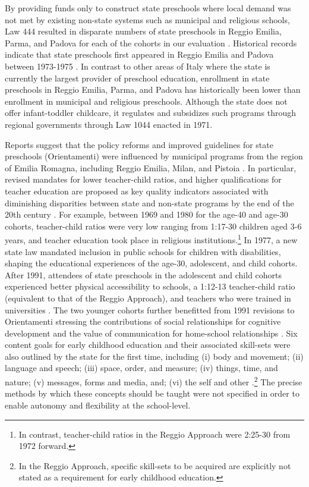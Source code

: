By providing funds only to construct state preschools where local demand was not met by existing non-state systems such as municipal and religious schools, Law 444 resulted in disparate numbers of state preschools in Reggio Emilia, Parma, and Padova for each of the cohorts in our evaluation \citep{Hohnerlein_2009_Paradox-Public-Preschools}. Historical records indicate that state preschools first appeared in Reggio Emilia and Padova between 1973-1975 \citep{Padova-Admin-Data_1964-2011,Reggio-Admin-data_1966-2006,Reggio-Annual-Journals_1994-2011}. In contrast to other areas of Italy where the state is currently the largest provider of preschool education, enrollment in state preschools in Reggio Emilia, Parma, and Padova has historically been lower than enrollment in municipal and religious preschools. Although the state does not offer infant-toddler childcare, it regulates and subsidizes such programs through regional governments through Law 1044 enacted in 1971.

Reports suggest that the policy reforms and improved guidelines for state preschools (Orientamenti) were influenced by municipal programs from the region of Emilia Romagna, including Reggio Emilia, Milan, and Pistoia \citep{OECD_2001_Italy-Country-Note}. In particular, revised mandates for lower teacher-child ratios, and higher qualifications for teacher education are proposed as key quality indicators associated with diminishing disparities between state and non-state programs by the end of the 20th century \citep{Hohnerlein_2015_Development-and-Diffusion}. For example, between 1969 and 1980 for the age-40 and age-30 cohorts, teacher-child ratios were very low ranging from 1:17-30 children aged 3-6 years, and teacher education took place in religious institutions.\footnote{In contrast, teacher-child ratios in the Reggio Approach were 2:25-30 from 1972 forward.} In 1977, a new state law mandated inclusion in public schools for children with disabilities, shaping the educational experiences of the age-30, adolescent, and child cohorts. After 1991, attendees of state preschools in the adolescent and child cohorts experienced better physical accessibility to schools, a 1:12-13 teacher-child ratio (equivalent to that of the Reggio Approach), and teachers who were trained in universities \citep{Hohnerlein_2015_Development-and-Diffusion}. The two younger cohorts further benefitted from 1991 revisions to Orientamenti stressing the contributions of social relationships for cognitive development and the value of communication for home-school relationships \citep{OECD_2001_Italy-Country-Note}. Six content goals for early childhood education and their associated skill-sets were also outlined by the state for the first time, including (i) body and movement; (ii) language and speech; (iii) space, order, and measure; (iv) things, time, and nature; (v) messages, forms and media, and; (vi) the self and other \citep{Orientamenti_1991_Scuola-Materna}.\footnote{In the Reggio Approach, specific skill-sets to be acquired are explicitly not stated as a requirement for early childhood education.} The precise methods by which these concepts should be taught were not specified in order to enable autonomy and flexibility at the school-level.

